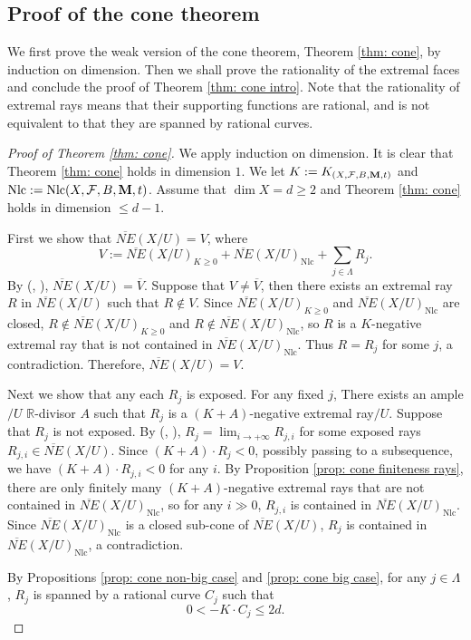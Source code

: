 \documentclass[12pt]{amsart}
\numberwithin{equation}{section}
\newcommand{\Mm}{{\bf{M}}}
\newcommand{\Rr}{\mathbb{R}}
\newcommand{\Nlc}{\operatorname{Nlc}}
\newcommand{\Ff}{\mathcal{F}}
\theoremstyle{definition}
\theoremstyle{definition}
\theoremstyle{definition}
\begin{document}
\subsection{Proof of the cone theorem}

We first prove the weak version of the cone theorem, Theorem \ref{thm: cone}, by induction on dimension. Then we shall prove the rationality of the extremal faces and conclude the proof of Theorem \ref{thm: cone intro}. Note that the rationality of extremal rays means that their supporting functions are rational, and is not equivalent to that they are spanned by rational curves.

\begin{proof}[Proof of Theorem \ref{thm: cone}]
We apply induction on dimension. It is clear that Theorem \ref{thm: cone} holds in dimension $1$. We let $K:=K_{(X,\Ff,B,\Mm,t)}$ and $\Nlc:=\Nlc(X,\Ff,B,\Mm,t)$. Assume that $\dim X=d\geq 2$ and  Theorem \ref{thm: cone} holds in dimension $\leq d-1$.

First we show that $\overline{NE}(X/U)=V$, where
$$V:=\overline{NE}(X/U)_{K\geq 0}+\overline{NE}(X/U)_{\Nlc}+\sum_{j\in\Lambda}R_j.$$
 By \cite[Definition-Lemma 3.1.8]{CHLX23} (\cite[Corollary 18.7.1]{Roc97}, \cite[Lemma 6.2]{Spi20}), $\overline{NE}(X/U)=\overline{V}$. Suppose that $V\not=\overline{V}$, then there exists an extremal ray $R$ in $\overline{NE}(X/U)$ such that $R\not\in V$. Since $\overline{NE}(X/U)_{K\geq 0}$ and $\overline{NE}(X/U)_{\Nlc}$ are closed, $R\not\in \overline{NE}(X/U)_{K\geq 0}$ and $R\not\in \overline{NE}(X/U)_{\Nlc}$, so $R$ is a $K$-negative extremal ray that is not contained in $\overline{NE}(X/U)_{\Nlc}$. Thus $R=R_j$ for some $j$, a contradiction. Therefore, $\overline{NE}(X/U)=V$.

Next we show that any each $R_j$ is exposed. For any fixed $j$, There exists an ample$/U$ $\Rr$-divisor $A$ such that $R_j$ is a $(K+A)$-negative extremal ray$/U$. Suppose that $R_j$ is not exposed. By \cite[Definition-Lemma 3.1.8]{CHLX23} (\cite[Corollary 18.7.1]{Roc97}, \cite[Lemma 6.2]{Spi20}), $R_j=\lim_{i\rightarrow+\infty}R_{j,i}$ for some exposed rays $R_{j,i}\in\overline{NE}(X/U)$. Since $(K+A)\cdot R_j<0$, possibly passing to a subsequence, we have $(K+A)\cdot R_{j,i}<0$ for any $i$.  By Proposition \ref{prop: cone finiteness rays}, there are only finitely many $(K+A)$-negative extremal rays that are not contained in $\overline{NE}(X/U)_{\Nlc}$, so for any $i\gg 0$, $R_{j,i}$ is contained in $\overline{NE}(X/U)_{\Nlc}$. Since $\overline{NE}(X/U)_{\Nlc}$ is a closed sub-cone of $\overline{NE}(X/U)$, $R_j$ is contained in $\overline{NE}(X/U)_{\Nlc}$, a contradiction.

By Propositions \ref{prop: cone non-big case} and \ref{prop: cone big case}, for any $j\in\Lambda$, $R_j$ is spanned by a rational curve $C_j$ such that
$$0<-K\cdot C_j\leq 2d.$$
\end{proof}
\end{document}
